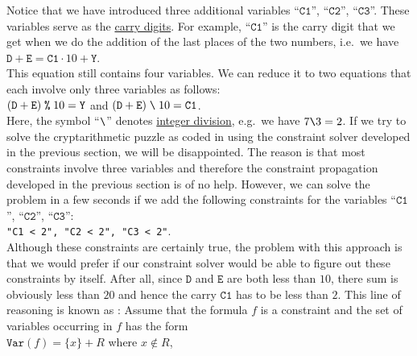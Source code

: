 Notice that we have introduced three additional variables ``$\texttt{C1}$'', ``$\texttt{C2}$'', ``$\texttt{C3}$''. 
These variables serve as the \href{https://en.wikipedia.org/wiki/Carry_(arithmetic)}{carry digits}.  For
example, ``$\texttt{C1}$'' is the carry digit that we get when we do the addition of the last places of the two
numbers, i.e.~we have
\\[0.2cm]
\hspace*{1.3cm}
$\texttt{D} + \texttt{E} = \texttt{C1} \cdot 10 + \texttt{Y}$.
\\[0.2cm]
This equation still contains four variables.  We can reduce it to two equations that each involve only three
variables as follows:
\\[0.2cm]
\hspace*{1.3cm}
$(\texttt{D} + \texttt{E})\; \texttt{\symbol{37}}\; 10 = \texttt{Y}$ \quad and \quad
$(\texttt{D} + \texttt{E}) \;\texttt{\symbol{92}}\; 10 = \texttt{C1}$.
\\[0.2cm]
Here, the symbol ``$\texttt{\symbol{92}}$'' denotes 
\href{https://en.wikipedia.org/wiki/Division_(mathematics)#Of_integers}{integer division}, e.g.~we have $7 \texttt{\symbol{92}} 3 = 2$.
If we try to solve the cryptarithmetic puzzle as coded in  using the
constraint solver developed in the previous section, we will be disappointed.  The reason is that most
constraints involve three variables and therefore the constraint propagation developed in the previous section
is of no help.  However, we can solve the problem in a few seconds if we add the following constraints for the
variables ``$\texttt{C1}$'', ``$\texttt{C2}$'', ``$\texttt{C3}$'':
\\[0.2cm]
\hspace*{1.3cm}
\texttt{"C1 < 2", "C2 < 2", "C3 < 2"}.
\\[0.2cm]
Although these constraints are certainly true, the problem with this approach is that we would prefer if our
constraint solver would be able to figure out these constraints by itself.  After all, since $\texttt{D}$ and
$\texttt{E}$ are both less than $10$, there sum is obviously less than $20$ and hence the carry $\texttt{C1}$
has to be less than $2$.  This line of reasoning is known as :
Assume that the formula $f$ is a constraint and the set of variables occurring in $f$ has the form
\\[0.2cm]
\hspace*{1.3cm}
$\texttt{Var}(f) = \{ x \} + R$ \quad where $x \not\in R$,
\\[0.2cm]
